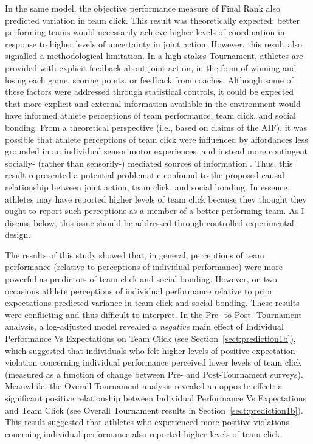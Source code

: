 \begin{CJK}{UTF8}{gbsn}
In the same model, the objective performance measure of Final Rank also predicted variation in team click.  This result was theoretically expected: better performing teams would necessarily achieve higher levels of coordination in response to higher levels of uncertainty in joint action.  However, this result also signalled a methodological limitation.  In a high-stakes Tournament, athletes are provided with explicit feedback about joint action, in the form of winning and losing each game, scoring points, or feedback from coaches.   Although some of these factors were addressed through statistical controls, it could be expected that more explicit and external information available in the environment would have informed athlete perceptions of team performance, team click, and social bonding. From a theoretical perspective (i.e., based on claims of the AIF), it was possible that athlete perceptions of team click were influenced by affordances less grounded in an individual sensorimotor experiences, and instead more contingent socially- (rather than sensorily-) mediated sources of information \citep{Ramstead2016}.  Thus, this result represented a potential problematic confound to the proposed causal relationship between joint action, team click, and social bonding.  In essence, athletes may have reported higher levels of team click because they thought they ought to report such perceptions as a member of a better performing team. As I discuss below, this issue should be addressed through controlled experimental design.

The results of this study showed that, in general, perceptions of team performance (relative to perceptions of individual performance) were more powerful as predictors of team click and social bonding.  However, on two occasions athlete perceptions of individual performance relative to prior expectations predicted variance in team click and social bonding. These results were conflicting and thus difficult to interpret.  In the Pre- to Post- Tournament analysis, a log-adjusted model revealed a \textit{negative} main effect of Individual Performance Vs Expectations on Team Click (see Section~\ref{sect:prediction1b}), which suggested that individuals who felt higher levels of positive expectation violation concerning individual performance perceived lower levels of team click (measured as a function of change between Pre- and Post-Tournament surveys).  Meanwhile, the Overall Tournament analysis revealed an opposite effect: a significant positive relationship between Individual Performance Vs Expectations and Team Click (see Overall Tournament results in Section~\ref{sect:prediction1b}). This result suggested that athletes who experienced more positive violations conerning individual performance also reported higher levels of team click.


\end{CJK}

